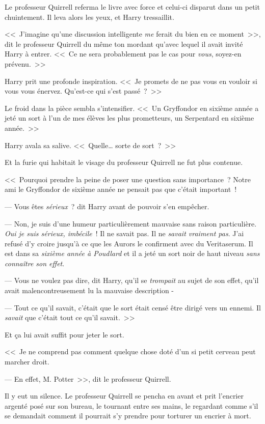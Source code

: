 Le professeur Quirrell referma le livre avec force et celui-ci disparut dans un petit chuintement. Il leva alors les yeux, et Harry tressaillit.

<<~J'imagine qu'une discussion intelligente \emph{me} ferait du bien en ce moment~>>, dit le professeur Quirrell du même ton mordant qu'avec lequel il avait invité Harry à entrer. <<~Ce ne sera probablement pas le cas pour \emph{vous}, soyez-en prévenu.~>>

Harry prit une profonde inspiration. <<~Je promets de ne pas vous en vouloir si vous vous énervez. Qu'est-ce qui s'est passé~?~>>

Le froid dans la pièce sembla s'intensifier. <<~Un Gryffondor en sixième année a jeté un sort à l'un de mes élèves les plus prometteurs, un Serpentard en sixième année.~>>

Harry avala sa salive. <<~Quelle… sorte de sort~?~>>

Et la furie qui habitait le visage du professeur Quirrell ne fut plus contenue.

<<~Pourquoi prendre la peine de poser une question sans importance~? Notre ami le Gryffondor de sixième année ne pensait pas que c'était important~!

--- Vous êtes \emph{sérieux}~? dit Harry avant de pouvoir s'en empêcher.

--- Non, je suis d'une humeur particulièrement mauvaise sans raison particulière. \emph{Oui je suis sérieux, imbécile}~! Il ne savait pas. Il ne \emph{savait vraiment pas}. J'ai refusé d'y croire jusqu'à ce que les Aurors le confirment avec du Veritaserum. Il est dans sa \emph{sixième année à Poudlard} et il a jeté un sort noir de haut niveau \emph{sans connaître son effet}.

--- Vous ne voulez pas dire, dit Harry, qu'il se \emph{trompait} au sujet de son effet, qu'il avait malencontreusement lu la mauvaise description -

--- Tout ce qu'il savait, c'était que le sort était censé être dirigé vers un ennemi. Il \emph{savait} que c'était tout ce qu'il savait.~>>

Et ça lui avait suffit pour jeter le sort.

<<~Je ne comprend pas comment quelque chose doté d'un si petit cerveau peut marcher droit.

--- En effet, M. Potter~>>, dit le professeur Quirrell.

Il y eut un silence. Le professeur Quirrell se pencha en avant et prit l'encrier argenté posé sur son bureau, le tournant entre ses mains, le regardant comme s'il se demandait comment il pourrait s'y prendre pour torturer un encrier à mort.

